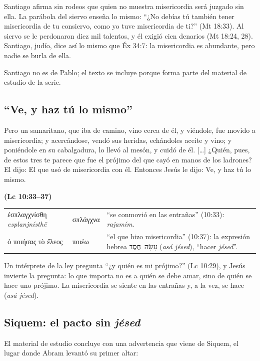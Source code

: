 \documentclass[11pt,letterpaper]{article}
\newcommand{\heb}[1]{\mbox{\foreignlanguage{hebrew}{#1}}}
\newcommand{\grc}[1]{\foreignlanguage{ancientgreek}{#1}}
\newcommand{\fuente}[1]{\par\hfill{\upshape\bfseries\small\textcolor{azul}{#1}}}
\begin{document}
Santiago afirma sin rodeos que quien no muestra misericordia será juzgado sin ella. La parábola del siervo enseña lo mismo: ``¿No debías tú también tener misericordia de tu consiervo, como yo tuve misericordia de ti?'' (Mt 18:33). Al siervo se le perdonaron diez mil talentos, y él exigió cien denarios (Mt 18:24, 28). Santiago, judío, dice así lo mismo que Éx 34:7: la misericordia es abundante, pero nadie se burla de ella.

\begin{nota}[Precisión]
Santiago no es de Pablo; el texto se incluye porque forma parte del material de estudio de la serie.
\end{nota}

\subsection{``Ve, y haz tú lo mismo''}
\begin{cita}Pero un samaritano, que iba de camino, vino cerca de él, y viéndole, fue movido a misericordia; y acercándose, vendó sus heridas, echándoles aceite y vino; y poniéndole en su cabalgadura, lo llevó al mesón, y cuidó de él. [\ldots] ¿Quién, pues, de estos tres te parece que fue el prójimo del que cayó en manos de los ladrones? El dijo: El que usó de misericordia con él. Entonces Jesús le dijo: Ve, y haz tú lo mismo.\fuente{(Lc 10:33--37)}\end{cita}

\begin{filologia}[Lc 10:33, 37]
\begin{tabular}{@{}L{3.2cm}L{1.6cm}L{10cm}@{}}
\grc{ἐσπλαγχνίσθη} \emph{esplanjnísthē} & \grc{σπλάγχνα} & ``se conmovió en las entrañas'' (10:33): \emph{rajamím}. \\[2pt]
\grc{ὁ ποιήσας τὸ ἔλεος} & \grc{ποιέω} & ``el que hizo misericordia'' (10:37): la expresión hebrea \heb{עָשָׂה חֶסֶד} (\emph{asá jésed}), ``hacer \emph{jésed}''. \\
\end{tabular}
\end{filologia}

Un intérprete de la ley pregunta ``¿y quién es mi prójimo?'' (Lc 10:29), y Jesús invierte la pregunta: lo que importa no es a quién se debe amar, sino de quién se hace uno prójimo. La misericordia se siente en las entrañas y, a la vez, se hace (\emph{asá jésed}).

\subsection{Siquem: el pacto sin \emph{jésed}}\label{sec:siquem}
El material de estudio concluye con una advertencia que viene de Siquem, el lugar donde Abram levantó su primer altar:
\end{document}
